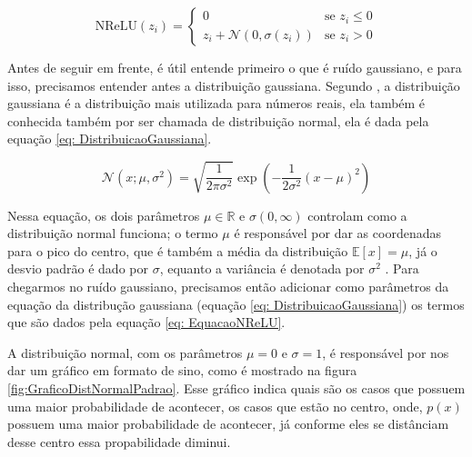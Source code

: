 \begin{equation}
    \text{NReLU}(z_i) = \begin{cases} 
    0 & \text{se } z_i \le 0 \\ 
    z_i + \mathcal{N} (0, \sigma(z_i)) & \text{se } z_i > 0 
    \end{cases}
    \label{eq:nrelu}
\end{equation}

Antes de seguir em frente, é útil entende primeiro o que é ruído gaussiano, e para isso, precisamos entender antes a distribuição gaussiana. Segundo \textcite{DeepLearningBook}, a distribuição gaussiana é a distribuição mais utilizada para números reais, ela também é conhecida também por ser chamada de distribuição normal, ela é dada pela equação \ref{eq: DistribuicaoGaussiana}.

\begin{equation}
    \mathcal{N}(x; \mu, \sigma^2) = \sqrt{\frac{1}{2\pi\sigma^2}} \exp\left( -\frac{1}{2\sigma^2}(x - \mu)^2 \right)
    \label{eq: DistribuicaoGaussiana}
\end{equation}

Nessa equação, os dois parâmetros $\mu \in \mathbb{R}$ e $\sigma (0, \infty)$ controlam como a distribuição normal funciona; o termo $\mu$ é responsável por dar as coordenadas para o pico do centro, que é também a média da distribuição $\mathbb{E}[x] = \mu$, já o desvio padrão é dado por $\sigma$, equanto a variância é denotada por $\sigma^2$ \parencite{DeepLearningBook}. Para chegarmos no ruído gaussiano, precisamos então adicionar como parâmetros da equação da distribução gaussiana (equação \ref{eq: DistribuicaoGaussiana}) os termos que são dados pela equação \ref{eq: EquacaoNReLU}. 

A distribuição normal, com os parâmetros $\mu = 0$ e $\sigma=1$, é responsável por nos dar um gráfico em formato de sino, como é mostrado na figura \ref{fig:GraficoDistNormalPadrao}. Esse gráfico indica quais são os casos que possuem uma maior probabilidade de acontecer, os casos que estão no centro, onde, $p(x)$ possuem uma maior probabilidade de acontecer, já conforme eles se distânciam desse centro essa propabilidade diminui.

